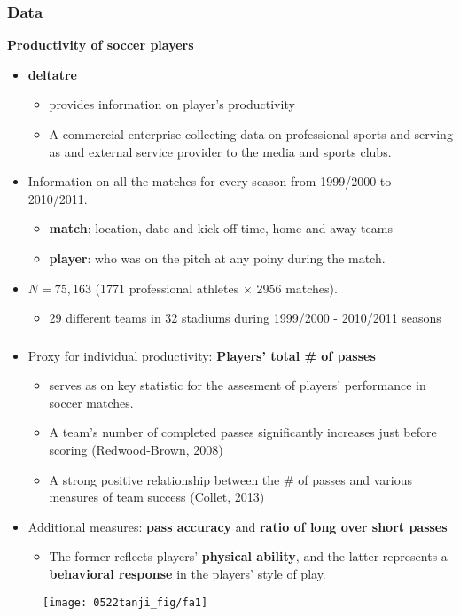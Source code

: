 \documentclass[dvipdfmx,11pt]{beamer}
\begin{document}
\begin{frame}\frametitle{Data}
  \textbf{Productivity of soccer players}
  \begin{itemize}
    \item \textbf{deltatre}
    \begin{itemize}
      \item provides information on player's productivity
      \item A commercial enterprise collecting data on professional sports and serving as and external service provider to the media and sports clubs.
    \end{itemize}
    \item Information on all the matches for every season from 1999/2000 to 2010/2011.
    \begin{itemize}
      \item \textbf{match}: location, date and kick-off time, home and away teams
      \item \textbf{player}: who was on the pitch at any poiny during the match.
    \end{itemize}
    \item $N = 75,163$ (1771 professional athletes $\times$ 2956 matches).
    \begin{itemize}
      \item 29 different teams in 32 stadiums during 1999/2000 - 2010/2011 seasons
    \end{itemize}
  \end{itemize}
\end{frame}

\begin{frame}\frametitle{}
  \begin{itemize}
    \item Proxy for individual productivity: \textbf{Players' total \# of passes}
    \begin{itemize}
      \item serves as on key statistic for the assesment of players' performance in soccer matches.
      \item A team's number of completed passes significantly increases just before scoring (Redwood-Brown, 2008)
      \item A strong positive relationship between the \# of passes and various measures of team success (Collet, 2013)
    \end{itemize}
    \item Additional measures: \textbf{pass accuracy} and \textbf{ratio of long over short passes}
    \begin{itemize}
      \item The former reflects players' \textbf{physical ability}, and the latter represents a \textbf{behavioral response} in the players' style of play.
    \end{itemize}
  \end{itemize}
  \begin{figure}
    \centering
    \texttt{[image: 0522tanji\_fig/fa1]}
    \label{fa1}
  \end{figure}
\end{frame}
\end{document}
